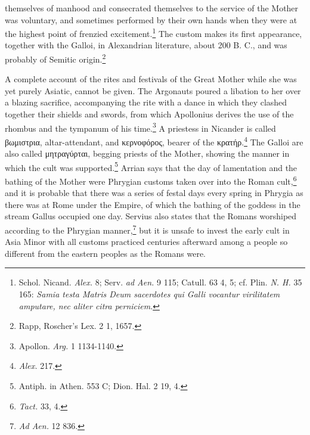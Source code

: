 \documentclass[a4paper, 11pt, oneside, polutonikogreek, english]{article}
\begin{document}
themselves of manhood and consecrated themselves to the service of the Mother was voluntary, and sometimes performed by their own hands when they were at the highest point of frenzied excitement.\footnote{Schol. Nicand. \emph{Alex.} 8; Serv. \emph{ad Aen.} 9 115; Catull. 63 4, 5; cf. Plin. \emph{N. H.} 35 165: \emph{Samia testa Matris Deum sacerdotes qui Galli vocantur virilitatem amputare, nec aliter citra perniciem}.} The custom makes its first appearance, together with the Galloi, in Alexandrian literature, about 200 B. C., and was probably of Semitic origin.\footnote{Rapp, Roscher's Lex. 2 1, 1657.}

A complete account of the rites and festivals of the Great Mother while she was yet purely Asiatic, cannot be given. The Argonauts poured a libation to her over a blazing sacrifice, accompanying the rite with a dance in which they clashed together their shields and swords, from which Apollonius derives the use of the rhombus and the tympanum of his time.\footnote{Apollon. \emph{Arg.} 1 1134-1140.} A priestess in Nicander is called βωμιστρια, altar-attendant, and κερνοφόρος, bearer of the κρατήρ.\footnote{\emph{Alex.} 217.} The Galloi are also called μητραγύρται, begging priests of the Mother, showing the manner in which the cult was supported.\footnote{Antiph. in Athen. 553 C; Dion. Hal. 2 19, 4.} Arrian says that the day of lamentation and the bathing of the Mother were Phrygian customs taken over into the Roman cult,\footnote{\emph{Tact.} 33, 4.} and it is probable that there was a series of festal days every spring in Phrygia as there was at Rome under the Empire, of which the bathing of the goddess in the stream Gallus occupied one day. Servius also states that the Romans worshiped according to the Phrygian manner,\footnote{\emph{Ad Aen.} 12 836.} but it is unsafe to invest the early cult in Asia Minor with all customs practiced centuries afterward among a people so different from the eastern peoples as the Romans were.
\end{document}
